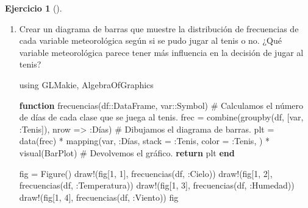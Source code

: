 \documentclass[
  a4paper,
]{scrreport}
\newenvironment{Shaded}{\begin{snugshade}}{\end{snugshade}}
\newcommand{\BuiltInTok}[1]{\textcolor[rgb]{0.00,0.23,0.31}{#1}}
\newcommand{\CommentTok}[1]{\textcolor[rgb]{0.37,0.37,0.37}{#1}}
\newcommand{\ControlFlowTok}[1]{\textcolor[rgb]{0.00,0.23,0.31}{\textbf{#1}}}
\newcommand{\DataTypeTok}[1]{\textcolor[rgb]{0.68,0.00,0.00}{#1}}
\newcommand{\FloatTok}[1]{\textcolor[rgb]{0.68,0.00,0.00}{#1}}
\newcommand{\FunctionTok}[1]{\textcolor[rgb]{0.28,0.35,0.67}{#1}}
\newcommand{\ImportTok}[1]{\textcolor[rgb]{0.00,0.46,0.62}{#1}}
\newcommand{\KeywordTok}[1]{\textcolor[rgb]{0.00,0.23,0.31}{\textbf{#1}}}
\newcommand{\NormalTok}[1]{\textcolor[rgb]{0.00,0.23,0.31}{#1}}
\newcommand{\OperatorTok}[1]{\textcolor[rgb]{0.37,0.37,0.37}{#1}}
\theoremstyle{definition}
\newtheorem{exercise}{Ejercicio}[chapter]
\theoremstyle{remark}
\begin{document}
\begin{exercise}[]
\begin{enumerate}
\begin{tcolorbox}
  \end{tcolorbox}
\item
  Crear un diagrama de barras que muestre la distribución de frecuencias
  de cada variable meteorológica según si se pudo jugar al tenis o no.
  ¿Qué variable meteorológica parece tener más influencia en la decisión
  de jugar al tenis?

  \begin{tcolorbox}[enhanced jigsaw, toptitle=1mm, breakable, toprule=.15mm, opacitybacktitle=0.6, coltitle=black, titlerule=0mm, arc=.35mm, title=\textcolor{quarto-callout-tip-color}{\faLightbulb}\hspace{0.5em}{Solución}, rightrule=.15mm, opacityback=0, colback=white, bottomrule=.15mm, leftrule=.75mm, colbacktitle=quarto-callout-tip-color!10!white, bottomtitle=1mm, colframe=quarto-callout-tip-color-frame, left=2mm]

\begin{Shaded}
\begin{Highlighting}[]
\ImportTok{using} \BuiltInTok{GLMakie}\NormalTok{, }\BuiltInTok{AlgebraOfGraphics}

\KeywordTok{function} \FunctionTok{frecuencias}\NormalTok{(df}\OperatorTok{::}\DataTypeTok{DataFrame}\NormalTok{, var}\OperatorTok{::}\DataTypeTok{Symbol}\NormalTok{)}
    \CommentTok{\# Calculamos el número de días de cada clase que se juega al tenis.}
\NormalTok{    frec }\OperatorTok{=} \FunctionTok{combine}\NormalTok{(}\FunctionTok{groupby}\NormalTok{(df, [var, }\OperatorTok{:}\NormalTok{Tenis]), nrow }\OperatorTok{=\textgreater{}} \OperatorTok{:}\NormalTok{Días)}
    \CommentTok{\# Dibujamos el diagrama de barras.}
\NormalTok{    plt }\OperatorTok{=} \FunctionTok{data}\NormalTok{(frec) }\OperatorTok{*} 
    \FunctionTok{mapping}\NormalTok{(var, }\OperatorTok{:}\NormalTok{Días, stack }\OperatorTok{=} \OperatorTok{:}\NormalTok{Tenis, color }\OperatorTok{=} \OperatorTok{:}\NormalTok{Tenis, ) }\OperatorTok{*} 
    \FunctionTok{visual}\NormalTok{(BarPlot) }
    \CommentTok{\# Devolvemos el gráfico.}
    \ControlFlowTok{return}\NormalTok{ plt}
\KeywordTok{end}

\NormalTok{fig }\OperatorTok{=} \FunctionTok{Figure}\NormalTok{()}
\FunctionTok{draw!}\NormalTok{(fig[}\FloatTok{1}\NormalTok{, }\FloatTok{1}\NormalTok{], }\FunctionTok{frecuencias}\NormalTok{(df, }\OperatorTok{:}\NormalTok{Cielo))}
\FunctionTok{draw!}\NormalTok{(fig[}\FloatTok{1}\NormalTok{, }\FloatTok{2}\NormalTok{], }\FunctionTok{frecuencias}\NormalTok{(df, }\OperatorTok{:}\NormalTok{Temperatura))}
\FunctionTok{draw!}\NormalTok{(fig[}\FloatTok{1}\NormalTok{, }\FloatTok{3}\NormalTok{], }\FunctionTok{frecuencias}\NormalTok{(df, }\OperatorTok{:}\NormalTok{Humedad))}
\FunctionTok{draw!}\NormalTok{(fig[}\FloatTok{1}\NormalTok{, }\FloatTok{4}\NormalTok{], }\FunctionTok{frecuencias}\NormalTok{(df, }\OperatorTok{:}\NormalTok{Viento))}
\NormalTok{fig}
\end{Highlighting}
\end{Shaded}


\end{tcolorbox}
\end{enumerate}
\end{exercise}
\end{document}
